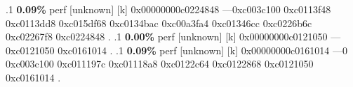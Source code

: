\begin{profile}
{.1 \textbf{ 0.09\%} perf             [unknown]              [k] 0x00000000c0224848\newline {} ---0xc003c100\newline {} 0xc0113f48\newline {} 0xc0113dd8\newline {} 0xc015df68\newline {} 0xc0134bac\newline {} 0xc00a3fa4\newline {} 0xc01346cc\newline {} 0xc0226b6c\newline {} 0xc02267f8\newline {} 0xc0224848\newline {} . 
.1 \textbf{ 0.00\%} perf             [unknown]              [k] 0x00000000c0121050\newline {} ---0xc0121050\newline {} 0xc0161014\newline {} . 
.1 \textbf{ 0.09\%} perf             [unknown]              [k] 0x00000000c0161014\newline {} ---0\newline {} 0xc003c100\newline {} 0xc011197c\newline {} 0xc01118a8\newline {} 0xc0122c64\newline {} 0xc0122868\newline {} 0xc0121050\newline {} 0xc0161014\newline {} . 
}
\end{profile}
